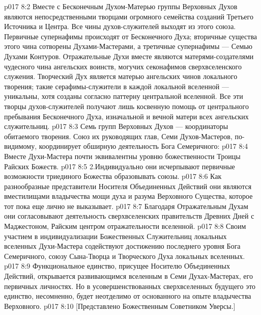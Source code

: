 \vs p017 8:2 \pc Вместе с Бесконечным Духом\hyp{}Матерью группы Верховных Духов являются непосредственными творцами огромного семейства созданий Третьего Источника и Центра. Все чины духов\hyp{}служителей выходят из этого союза. Первичные супернафимы происходят от Бесконечного Духа; вторичные существа этого чина сотворены Духами\hyp{}Мастерами, а третичные супернафимы --- Семью Духами Контуров. Отражательные Духи вместе являются матерями\hyp{}создателями чудесного чина ангельских воинств, могучих секонафимов сверхвселенского служения. Творческий Дух является матерью ангельских чинов локального творения; такие серафимы\hyp{}служители в каждой локальной вселенной --- уникальны, хотя созданы согласно паттерну центральной вселенной. Все эти творцы духов\hyp{}служителей получают лишь косвенную помощь от центрального пребывания Бесконечного Духа, изначальной и вечной матери всех ангельских служительниц.
\vs p017 8:3 \pc Семь групп Верховных Духов --- координаторы обитаемого творения. Союз их руководящих глав, Семи Духов\hyp{}Мастеров, по\hyp{}видимому, координирует обширную деятельность Бога Семеричного:
\vs p017 8:4 \bibnobreakspace Вместе Духи\hyp{}Мастера почти эквивалентны уровню божественности Троицы Райских Божеств.
\vs p017 8:5 2.Индивидуально они исчерпывают первичные возможности триединого Божества образовывать союзы.
\vs p017 8:6 \bibnobreakspace Как разнообразные представители Носителя Объединенных Действий они являются вместилищами владычества мощи духа и разума Верховного Существа, которое тот пока еще лично не выказывает.
\vs p017 8:7 \bibnobreakspace Благодаря Отражательным Духам они согласовывают деятельность сверхвселенских правительств Древних Дней с Маджестоном, Райским центром отражательности вселенной.
\vs p017 8:8 \bibnobreakspace Своим участием в индивидуализации Божественных Служительниц локальных вселенных Духи\hyp{}Мастера содействуют достижению последнего уровня Бога Семеричного, союзу Сына\hyp{}Творца и Творческого Духа локальных вселенных.
\vs p017 8:9 \pc Функциональное единство, присущее Носителю Объединенных Действий, открывается развивающимся вселенным в Семи Духах\hyp{}Мастерах, его первичных личностях. Но в усовершенствованных сверхвселенных будущего это единство, несомненно, будет неотделимо от основанного на опыте владычества Верховного.
\vsetoff
\vs p017 8:10 [Представлено Божественным Советником Уверсы.]
